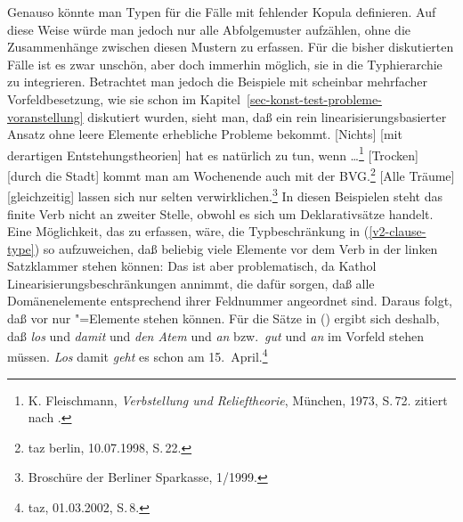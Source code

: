 Genauso könnte man Typen für die Fälle mit fehlender Kopula definieren. Auf diese Weise würde
man jedoch nur alle Abfolgemuster aufzählen, ohne die Zusammenhänge zwischen diesen Mustern
zu erfassen. Für die bisher diskutierten Fälle ist es zwar unschön, aber doch immerhin
möglich, sie in die Typhierarchie zu integrieren. Betrachtet man jedoch die Beispiele mit scheinbar
mehrfacher Vorfeldbesetzung, wie sie schon im Kapitel~\ref{sec-konst-test-probleme-voranstellung}
diskutiert wurden, sieht man, daß ein rein linearisierungsbasierter Ansatz ohne leere Elemente
erhebliche Probleme bekommt.
\eal
\ex {}[Nichts] [mit  derartigen     Entstehungstheorien] hat es natürlich zu tun, wenn \ldots\footnote{
        K. Fleischmann, \emph{Verbstellung und Relieftheorie}, München, 1973, S.\,72.
        zitiert nach .}
\label{bsp-nichts-mit-derartigen-udc}
\ex {}[Trocken] [durch   die Stadt] kommt man am     Wochenende auch mit  der BVG.\footnote{
        taz berlin, 10.07.1998, S.\,22.
      }\label{bsp-trocken-durch-die-stadt-udc}
\ex\label{bsp-alle-traeume-udc}
    {}[Alle Träume] [gleichzeitig]  lassen sich nur  selten verwirklichen.\footnote{
        Broschüre der Berliner Sparkasse, 1/1999.
        }
\zl
In diesen Beispielen steht das finite Verb nicht an zweiter Stelle, obwohl es sich um Deklarativsätze
handelt. Eine Möglichkeit, das zu erfassen, wäre, die Typbeschränkung in (\ref{v2-clause-type}) so aufzuweichen,
daß beliebig viele Elemente vor dem Verb in der linken Satzklammer stehen können:
\ea
  \impl {}
\z
Das ist aber problematisch, da Kathol Linearisierungsbeschränkungen annimmt, die dafür sorgen,
daß alle Domänenelemente entsprechend ihrer Feldnummer angeordnet sind. Daraus folgt, daß
vor  nur "=Elemente stehen können. Für die Sätze in () ergibt sich
deshalb, daß \emph{los} und \emph{damit} und \emph{den Atem} und \emph{an} bzw.\ \emph{gut}
und \emph{an} im Vorfeld stehen müssen.
\eal
\label{bsp-particle-vf-udc}
\ex\label{bsp-los-damit-udc} 
\emph{Los} damit \emph{geht} es schon am 15.\ April.\footnote{
        taz, 01.03.2002, S.\,8.%
    }
